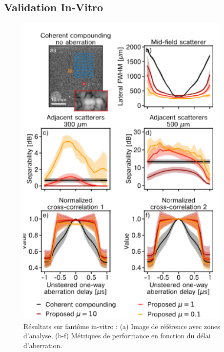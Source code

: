 \documentclass[12pt,a4paper]{article}
\begin{document}
\subsection{Validation In-Vitro}
\begin{figure}[H]
    \centering
    \includegraphics[width=0.95\textwidth]{paper/fig_6.png}
    \caption{Résultats sur fantôme in-vitro : (a) Image de référence avec zones d'analyse, (b-f) Métriques de performance en fonction du délai d'aberration.}
\end{figure}
\end{document}
